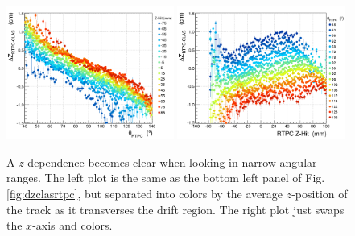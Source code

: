 \documentclass[amsmath,amssymb,notitlepage,11pt]{revtex4-1}
\begin{document}
\begin{figure}[htbp]\centering
    \includegraphics[width=0.49\textwidth]{pics/dz_theta_zhit_fid_A_small.png}
    \includegraphics[width=0.49\textwidth]{pics/dz_theta_zhit_fid_B_small.png}
    \caption{A $z$-dependence becomes clear when looking in narrow angular ranges.  The left plot is the same as the bottom left panel of Fig. \ref{fig:dzclasrtpc}, but separated into colors by the average $z$-position of the track as it transverses the drift region.  The right plot just swaps the $x$-axis and colors.\label{fig:dz_theta_z.png}}
\end{figure}
\end{document}
